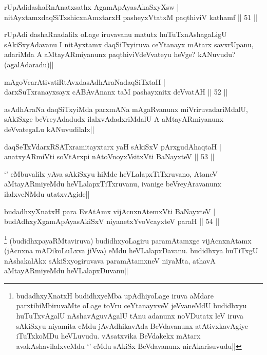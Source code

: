 \begin{shl}
rUpAdidashaRnAnatxsathx AgamApAyasAkaSxyXsw |\\
nitAyxtamxdaqSiTxshicxnAmxtarxH pasheyxVtatxM paqthiviV kathamf \hfill || 51 ||
\end{shl}

\begin{artha}
rUpAdi dashaRnadalilx oLage iruvavanu matutx huTuTxnAshagaLigU sAkiSxyAdavanu I nitAyxtamx daqSiTxyiruva ceYtanayx mAtarx savxrUpanu, adariMda A aMtayARmiyanunx paqthiviVdeVvateyu heVge? kANuvudu? (agalAdaradu)||
\end{artha}

\begin{shl}
mAgoVcarAtivatiRtAvxdasAdhAraNadaqSiTxtaH |\\
darxSuTxranayxsayx cABAvAnanx taM pashayxnitx deVvatAH \hfill || 52 ||
\end{shl}

\begin{artha}
asAdhAraNa daqSiTxyiMda parxmANa mAgaRvanunx miVriruvadariMdalU, sAkiSxge beVreyAdadudx ilalxvAdadxriMdalU A aMtayARmiyanunx deVvategaLu kANuvudilalx||
\end{artha}


\begin{shl}
daqSeTxVdarxRSATxramitayxtarx yaH sAkiSxV pArxgudAhaqtaH |\\
anatxyARmiVti soV\s tArxpi nAtoV\s noyxV\s sitxVti BaNayxteV \hfill || 53 ||
\end{shl}

\begin{artha}
`\stext ' eMbuvalilx yAva sAkiSxyu hiMde heVLalapxTiTxruvano, AtaneV aMtayARmiyeMdu heVLalapxTiTxruvanu, ivanige beVreyAravanunx ilalxveNMdu utatxvAgide|| 
\end{artha}


\begin{shl}
budadhxyXnatxH para EvA\s \s tAmx vijAcnxnAtemxVti BaNayxteV |\\
budAdhxyXgamApAyasAkiSxV niyanetxYvoVcayxteV paraH \hfill || 54 ||
\end{shl}

\begin{artha}
\footnote[1]{budadhxyXnatxH budidhxyeMba upAdhiyoLage iruva aMdare parxtibiMbiruvaMte oLage toVru ceYtanayxveV jeVvaneMdU budidhxyu huTuTxvAgalU nAshavAguvAgalU tAnu adanunx noVDutatx leV iruva sAkiSxyu niyamita eMdu jAvAdhikavAda BeVdavanunx atAtivxkavAgiye iTuTxkoMDu heVLuvudu. vAsatxvika BeVdakekx mAtarx avakAshavilalxveMdu `\stext' eMdu sAkiSx BeVdavanunx nirAkarisuvudu||} (budidhxpayaRMtaviruva) budidhxyoLagiru paramAtamxge vijAcnxnAtamx (jAcnxna mADikoLuLxva jiVva) eMdu heVLalapxDavanu. budidhxya huTiTxgU nAshakalAkx sAkiSxyogiruvava paramAtamxneV niyaMta, athavA aMtayARmiyeMdu heVLalapxDuvanu||
\end{artha}


